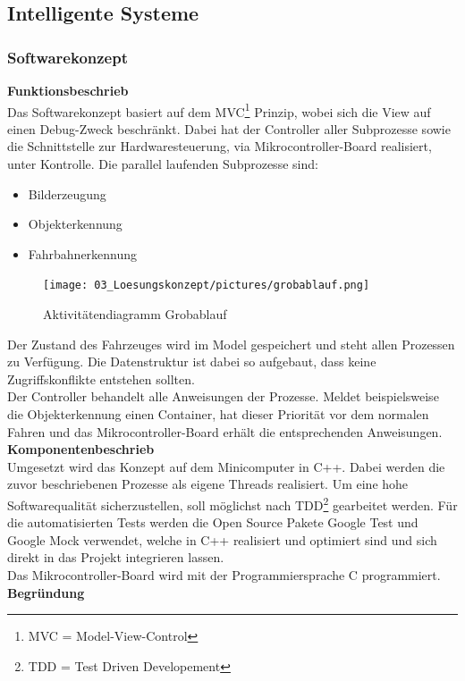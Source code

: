 \subsection{Intelligente Systeme}
\subsubsection{Softwarekonzept}
\textbf{Funktionsbeschrieb}\\[0.2cm]
Das Softwarekonzept basiert auf dem MVC\footnote{MVC = Model-View-Control} Prinzip, wobei sich die View auf einen Debug-Zweck beschränkt. Dabei hat der Controller aller Subprozesse sowie die Schnittstelle zur Hardwaresteuerung, via Mikrocontroller-Board realisiert, unter Kontrolle. Die parallel laufenden  Subprozesse sind:
\begin{itemize}
\item Bilderzeugung
\item Objekterkennung
\item Fahrbahnerkennung
\end{itemize}
\begin{figure}[H]
	\centering
	\texttt{[image: 03\_Loesungskonzept/pictures/grobablauf.png]}
	\caption{Aktivitätendiagramm Grobablauf}
\end{figure}\flushleft
Der Zustand des Fahrzeuges wird im Model gespeichert und steht allen Prozessen zu Verfügung. Die Datenstruktur ist dabei so aufgebaut, dass keine Zugriffskonflikte entstehen sollten.\\
Der Controller behandelt alle Anweisungen der Prozesse. Meldet beispielsweise die Objekterkennung einen Container, hat dieser Priorität vor dem normalen Fahren und das Mikrocontroller-Board erhält die entsprechenden Anweisungen.\\[0.2cm]
\textbf{Komponentenbeschrieb}\\[0.2cm]
Umgesetzt wird das Konzept auf dem Minicomputer in C++. Dabei werden die zuvor beschriebenen Prozesse als eigene Threads realisiert. Um eine hohe Softwarequalität sicherzustellen, soll möglichst nach TDD\footnote{TDD = Test Driven Developement} gearbeitet werden. Für die automatisierten Tests werden die Open Source Pakete Google Test und Google Mock verwendet, welche in C++ realisiert und optimiert sind und sich direkt in das Projekt integrieren lassen.\\
Das Mikrocontroller-Board wird mit der Programmiersprache C programmiert.\\[0.2cm]
\textbf{Begründung}\\[0.2cm]
